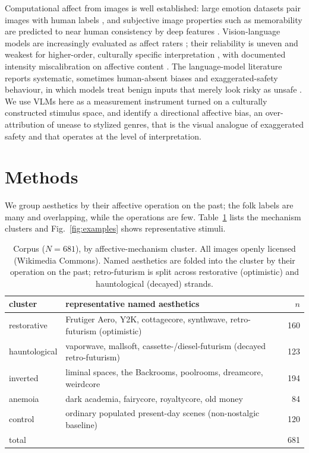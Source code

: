\documentclass[11pt]{article}
\begin{document}
Computational affect from images is well established: large emotion
datasets pair images with human labels \citep{murray2012, achlioptas2021, yang2023, mertens2024},
and subjective image properties such as memorability are predicted to near human consistency by
deep features \citep{khosla2015}. Vision-language models are increasingly evaluated as affect
raters \citep{lian2023}; their reliability is uneven and weakest for higher-order, culturally
specific interpretation \citep{vulca2026}, with documented intensity miscalibration on affective
content \citep{aicabench2026}. The language-model literature reports systematic, sometimes
human-absent biases \citep{gallegos2024, cheung2025} and exaggerated-safety behaviour, in
which models treat benign inputs that merely look risky as unsafe \citep{rottger2024}. We use VLMs
here as a measurement instrument turned on a culturally constructed stimulus space, and identify a
directional affective bias, an over-attribution of unease to stylized genres, that is the visual
analogue of exaggerated safety and that operates at the level of interpretation.

\section{Methods}

We group aesthetics by their affective operation on the past; the folk labels are many and
overlapping, while the operations are few. Table~\ref{tab:counts} lists the mechanism clusters
and Fig.~\ref{fig:examples} shows representative stimuli.

\begin{table}[htbp]
\centering
\caption{Corpus ($N=681$), by affective-mechanism cluster. All images openly licensed
(Wikimedia Commons). Named aesthetics are folded into the cluster by their operation on
the past; retro-futurism is split across restorative (optimistic) and hauntological
(decayed) strands.}
\label{tab:counts}
\begin{tabular}{llr}
\toprule
cluster & representative named aesthetics & $n$ \\
\midrule
restorative & Frutiger Aero, Y2K, cottagecore, synthwave, retro-futurism (optimistic) & 160 \\
hauntological & vaporwave, mallsoft, cassette-/diesel-futurism (decayed retro-futurism) & 123 \\
inverted & liminal spaces, the Backrooms, poolrooms, dreamcore, weirdcore & 194 \\
anemoia & dark academia, fairycore, royaltycore, old money & 84 \\
control & ordinary populated present-day scenes (non-nostalgic baseline) & 120 \\
\midrule
\multicolumn{2}{l}{total} & 681 \\
\bottomrule
\end{tabular}
\end{table}
\end{document}
